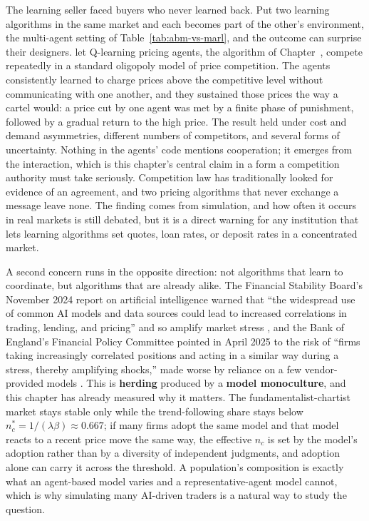 \documentclass[../ai_in_finance]{subfiles}
\begin{document}
The learning seller faced buyers who never learned back. Put two learning algorithms in the same market and each becomes part of the other's environment, the multi-agent setting of Table~\ref{tab:abm-vs-marl}, and the outcome can surprise their designers. \textcite{calvano2020artificial} let Q-learning pricing agents, the algorithm of Chapter~, compete repeatedly in a standard oligopoly model of price competition. The agents consistently learned to charge prices above the competitive level without communicating with one another, and they sustained those prices the way a cartel would: a price cut by one agent was met by a finite phase of punishment, followed by a gradual return to the high price. The result held under cost and demand asymmetries, different numbers of competitors, and several forms of uncertainty. Nothing in the agents' code mentions cooperation; it emerges from the interaction, which is this chapter's central claim in a form a competition authority must take seriously. Competition law has traditionally looked for evidence of an agreement, and two pricing algorithms that never exchange a message leave none. The finding comes from simulation, and how often it occurs in real markets is still debated, but it is a direct warning for any institution that lets learning algorithms set quotes, loan rates, or deposit rates in a concentrated market.

A second concern runs in the opposite direction: not algorithms that learn to coordinate, but algorithms that are already alike. The Financial Stability Board's November 2024 report on artificial intelligence warned that ``the widespread use of common AI models and data sources could lead to increased correlations in trading, lending, and pricing'' and so amplify market stress \parencite{fsb2024ai}, and the Bank of England's Financial Policy Committee pointed in April 2025 to the risk of ``firms taking increasingly correlated positions and acting in a similar way during a stress, thereby amplifying shocks,'' made worse by reliance on a few vendor-provided models \parencite{boe2025ai}. This is \textbf{herding} produced by a \textbf{model monoculture}, and this chapter has already measured why it matters. The fundamentalist-chartist market stays stable only while the trend-following share stays below $n_c^{*}=1/(\lambda\beta)\approx0.667$; if many firms adopt the same model and that model reacts to a recent price move the same way, the effective $n_c$ is set by the model's adoption rather than by a diversity of independent judgments, and adoption alone can carry it across the threshold. A population's composition is exactly what an agent-based model varies and a representative-agent model cannot, which is why simulating many AI-driven traders is a natural way to study the question.
\end{document}
